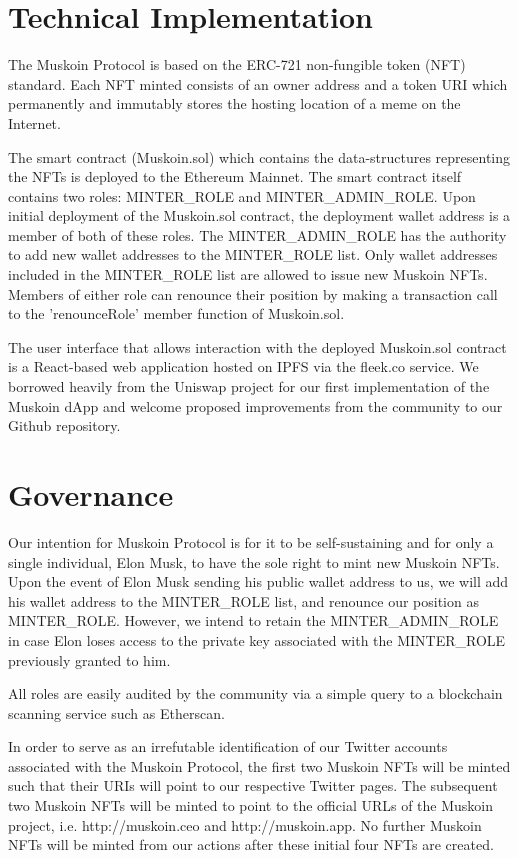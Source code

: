 \documentclass{article}
\begin{document}
\section{Technical Implementation}
The Muskoin Protocol is based on the ERC-721 non-fungible token (NFT) standard. Each NFT minted consists of an owner address and a token URI which permanently and immutably stores the hosting location of a meme on the Internet. 

The smart contract (Muskoin.sol) which contains the data-structures representing the NFTs is deployed to the Ethereum Mainnet. The smart contract itself contains two roles: MINTER\_ROLE and MINTER\_ADMIN\_ROLE. Upon initial deployment of the Muskoin.sol contract, the deployment wallet address is a member of both of these roles. The MINTER\_ADMIN\_ROLE has the authority to add new wallet addresses to the MINTER\_ROLE list. Only wallet addresses included in the MINTER\_ROLE list are allowed to issue new Muskoin NFTs. Members of either role can renounce their position by making a transaction call to the 'renounceRole' member function of Muskoin.sol. 

The user interface that allows interaction with the deployed Muskoin.sol contract is a React-based web application hosted on IPFS via the fleek.co service. We borrowed heavily from the Uniswap project for our first implementation of the Muskoin dApp and welcome proposed improvements from the community to our Github repository. 

\section{Governance}

Our intention for Muskoin Protocol is for it to be self-sustaining and for only a single individual, Elon Musk, to have the sole right to mint new Muskoin NFTs. Upon the event of Elon Musk sending his public wallet address to us, we will add his wallet address to the MINTER\_ROLE list, and renounce our position as MINTER\_ROLE. However, we intend to retain the MINTER\_ADMIN\_ROLE in case Elon loses access to the private key associated with the MINTER\_ROLE previously granted to him. 

All roles are easily audited by the community via a simple query to a blockchain scanning service such as Etherscan.

In order to serve as an irrefutable identification of our Twitter accounts associated with the Muskoin Protocol, the first two Muskoin NFTs will be minted such that their URIs will point to our respective Twitter pages. The subsequent two Muskoin NFTs will be minted to point to the official URLs of the Muskoin project, i.e. http://muskoin.ceo and http://muskoin.app. No further Muskoin NFTs will be minted from our actions after these initial four NFTs are created. 
\end{document}
